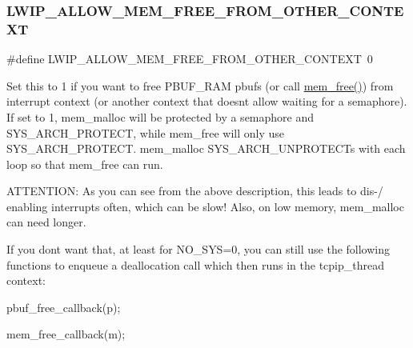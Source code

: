\subsubsection{\texorpdfstring{L\+W\+I\+P\+\_\+\+A\+L\+L\+O\+W\+\_\+\+M\+E\+M\+\_\+\+F\+R\+E\+E\+\_\+\+F\+R\+O\+M\+\_\+\+O\+T\+H\+E\+R\+\_\+\+C\+O\+N\+T\+E\+XT}{LWIP\_ALLOW\_MEM\_FREE\_FROM\_OTHER\_CONTEXT}\hspace{0.1cm}{\footnotesize\ttfamily [1/2]}}
{\footnotesize\ttfamily \#define L\+W\+I\+P\+\_\+\+A\+L\+L\+O\+W\+\_\+\+M\+E\+M\+\_\+\+F\+R\+E\+E\+\_\+\+F\+R\+O\+M\+\_\+\+O\+T\+H\+E\+R\+\_\+\+C\+O\+N\+T\+E\+XT~0}

Set this to 1 if you want to free P\+B\+U\+F\+\_\+\+R\+AM pbufs (or call \hyperlink{native_2lwip_2src_2core_2mem_8c_a65169147c44e9db60d997819af9b455c}{mem\+\_\+free()}) from interrupt context (or another context that doesn\textquotesingle{}t allow waiting for a semaphore). If set to 1, mem\+\_\+malloc will be protected by a semaphore and S\+Y\+S\+\_\+\+A\+R\+C\+H\+\_\+\+P\+R\+O\+T\+E\+CT, while mem\+\_\+free will only use S\+Y\+S\+\_\+\+A\+R\+C\+H\+\_\+\+P\+R\+O\+T\+E\+CT. mem\+\_\+malloc S\+Y\+S\+\_\+\+A\+R\+C\+H\+\_\+\+U\+N\+P\+R\+O\+T\+E\+C\+Ts with each loop so that mem\+\_\+free can run.

A\+T\+T\+E\+N\+T\+I\+ON\+: As you can see from the above description, this leads to dis-\// enabling interrupts often, which can be slow! Also, on low memory, mem\+\_\+malloc can need longer.

If you don\textquotesingle{}t want that, at least for N\+O\+\_\+\+S\+YS=0, you can still use the following functions to enqueue a deallocation call which then runs in the tcpip\+\_\+thread context\+:
\begin{DoxyItemize}
\item pbuf\+\_\+free\+\_\+callback(p);
\item mem\+\_\+free\+\_\+callback(m); 
\end{DoxyItemize}\mbox{\label{group__lwip__opts__mem_ga0a3ef6098813c103e5aba07da76e15e2}} 
